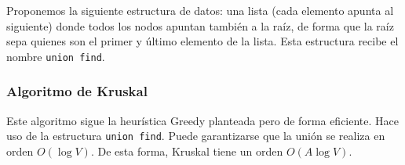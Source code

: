 Proponemos la siguiente estructura de datos: una lista (cada elemento apunta al siguiente) donde todos los nodos apuntan también a la raíz, de forma que la raíz sepa quienes son el primer y último elemento de la lista. Esta estructura recibe el nombre \verb|union find|.

\subsubsection{Algoritmo de Kruskal}
Este algoritmo sigue la heurística Greedy planteada pero de forma eficiente. Hace uso de la estructura \verb|union find|. Puede garantizarse que la unión se realiza en orden $O(\log V)$. De esta forma, Kruskal tiene un orden $O(A\log V)$.

